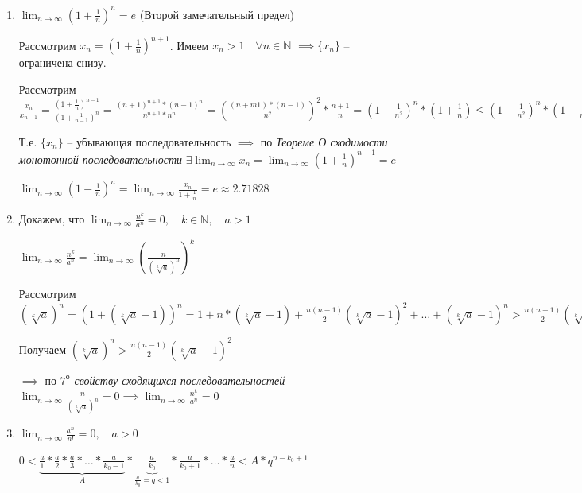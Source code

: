\documentclass{article}
\newcommand{\dslim}{\displaystyle\lim}
\newcommand{\dslimn}{\dslim_{n \to \infty}}
\theoremstyle{break}
\begin{document}
\begin{enumerate}
    \item $\displaystyle \lim_{n \to \infty} \left( 1 + \frac{1}{n} \right)^n = e$ (Второй замечательный предел)
    
    Рассмотрим $x_n = \left( 1 + \frac{1}{n} \right)^{n + 1}$. 
    Имеем $x_n > 1 \quad \forall n \in \mathbb{N}$ $\implies \{x_n\}$ -- ограничена снизу.

    Рассмотрим $\frac{x_n}{x_{n-1}} = 
    \frac{\left( 1 + \frac{1}{n} \right)^{n - 1}}{\left( 1 + \frac{1}{n - 1} \right)^{n}}
    = \frac{(n + 1)^{n+1} * (n - 1)^n}{n^{n+1} * n^n}
    = \left( \frac{(n + m1) * (n - 1)}{n^2} \right)^2 * \frac{n + 1}{n}
    = \left( 1 - \frac{1}{n^2} \right)^{n} * \left( 1 + \frac{1}{n} \right)
    \le \left( 1 - \frac{1}{n^2} \right)^{n} * \left( 1 + \frac{1}{n^2} \right)^n
    \le \left( 1 - \frac{1}{n^4} \right)^{n} < 1 \implies x_n < x_{n-1}$

    Т.е. $\{x_n\}$ -- убывающая последовательность $\implies$
    по \textit{Теореме О сходимости монотонной последовательности}
    $\exists \dslimn x_n = 
    \dslimn \left( 1 + \frac{1}{n} \right)^{n + 1} = e$

    $\dslimn \left( 1 - \frac{1}{n} \right)^{n}
    = \dslimn \frac{x_n}{1 + \frac{1}{n}} = e \approx 2.71828$


    \item Докажем, что $\dslimn \frac{n^k}{a^n} = 0,
    \quad k \in \mathbb{N}, \quad a > 1$

    $\dslimn \frac{n^k}{a^n} = 
    \dslimn \left( \frac{n}{(\sqrt[k]{a})^n} \right)^k$

    Рассмотрим $(\sqrt[k]{a})^n = (1 + (\sqrt[k]{a} - 1)) ^ n = 
    1 + n * (\sqrt[k]{a} - 1) + \frac{n (n - 1)}{2} (\sqrt[k]{a} - 1)^2
    + \dots + (\sqrt[k]{a} - 1)^n > \frac{n (n - 1)}{2} (\sqrt[k]{a} - 1)^2$

    Получаем $(\sqrt[k]{a})^n > \frac{n (n - 1)}{2} (\sqrt[k]{a} - 1)^2$

    $\implies$ по \textit{$7^{\text{о}}$ свойству сходящихся последовательностей}
    $\dslimn \frac{n}{(\sqrt[k]{a})^n} = 0
    \implies \dslimn \frac{n^k}{a^n} = 0$


    \item $\dslimn \frac{a^n}{n!} = 0, \quad a > 0$

    $0 < \underbrace{\frac{a}{1} * \frac{a}{2} * \frac{a}{3} * \dots * \frac{a}{k_0 - 1}}_A
    * \underbrace{\frac{a}{k_0}}_{\frac{a}{k_0} = q < 1}
    * \frac{a}{k_0 + 1} * \dots *
    \frac{a}{n} < A * q^{n - k_0 + 1}$


\end{enumerate}
\end{document}

